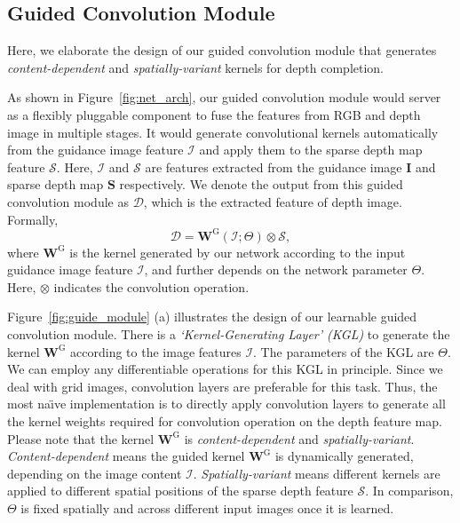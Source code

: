 \documentclass[journal]{IEEEtran}
\begin{document}
\subsection{Guided Convolution Module}
\label{subsec:guide_module}

Here, we elaborate the design of our guided convolution module that generates \emph{content-dependent} and \emph{spatially-variant} kernels for depth completion.

As shown in Figure~\ref{fig:net_arch},
our guided convolution module would server as a flexibly pluggable component to fuse the features from RGB and depth image in multiple stages.
It would generate convolutional kernels automatically from the guidance image feature $\mathcal{I}$ and apply them to the sparse depth map feature $\mathcal{S}$.
Here, $\mathcal{I}$ and $\mathcal{S}$ are features extracted from the guidance image $\mathbf{I}$ and sparse depth map $\mathbf{S}$ respectively.
We denote the output from this guided convolution module as $\mathcal{D}$, which is the extracted feature of depth image. Formally, 
\begin{equation}
\label{eq:our_guided_filter}
   \mathcal{D} = \mathbf{W}^{\mathrm{G}}(\mathcal{I}; \Theta) \otimes \mathcal{S},
\end{equation}
where $\mathbf{W}^{\mathrm{G}}$ is the kernel generated by our network according to the input guidance image feature $\mathcal{I}$, and further depends on the network parameter $\Theta$.
Here, $\otimes$ indicates the convolution operation. 

Figure~\ref{fig:guide_module} (a) illustrates the design of our learnable guided convolution module.
There is a \emph{`Kernel-Generating Layer' (KGL)} to generate the kernel $\mathbf{W}^\mathrm{G}$ according to the image features $\mathcal{I}$.
The parameters of the KGL are $\Theta$.
We can employ any differentiable operations for this KGL in principle.
Since we deal with grid images, convolution layers are preferable for this task.
Thus, the most na\"{\i}ve implementation is to directly apply convolution layers to generate all the kernel weights required for convolution operation on the depth feature map.
Please note that the kernel $\mathbf{W}^{\mathrm{G}}$ is  \emph{content-dependent} and \emph{spatially-variant}.
\emph{Content-dependent} means the guided kernel $\mathbf{W}^\mathrm{G}$ is dynamically generated, depending on the image content $\mathcal{I}$.
\emph{Spatially-variant} means different kernels are applied to different spatial positions of the sparse depth feature $\mathcal{S}$.
In comparison, $\Theta$ is fixed spatially and across different input images once it is learned.
\end{document}
